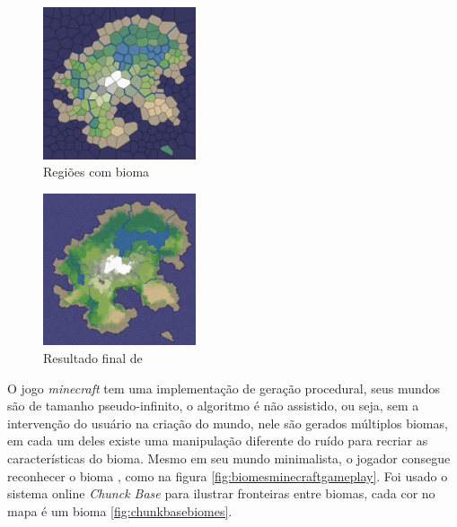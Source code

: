 \begin{figure}[H]
    \centering
    \includegraphics[width=0.4\textwidth]{figuras/patel2010biomes.png}
    \caption{Regiões com bioma}
    \label{fig:patel2010biomes}
\end{figure}

\begin{figure}[H]
    \centering
    \includegraphics[width=0.4\textwidth]{figuras/voronoi-map-goal-distorted.png}
    \caption{Resultado final de \cite{patel2010polygonal}}
    \label{fig:voronoi-map-goal-distorted}
\end{figure}

O jogo \textit{minecraft} tem uma implementação de geração procedural,
seus mundos são de tamanho pseudo-infinito, 
o algoritmo é não assistido, ou seja, sem a intervenção
do usuário na criação do mundo, nele
são gerados múltiplos biomas, em cada um deles existe uma manipulação diferente
do ruído para recriar as características do bioma. Mesmo em seu mundo
minimalista, o jogador consegue reconhecer o bioma \cite{short2012teaching},
como na figura \ref{fig:biomesminecraftgameplay}.
Foi usado o sistema online \textit{Chunck Base} para 
ilustrar fronteiras entre biomas, cada cor no mapa é um bioma \ref{fig:chunkbasebiomes}.


